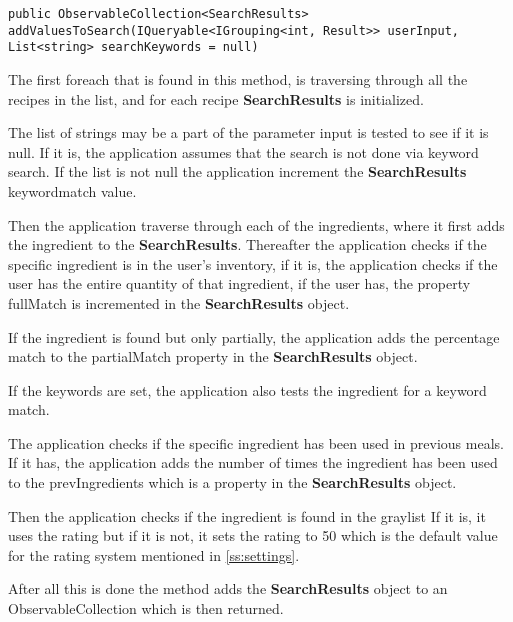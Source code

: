 \begin{lstlisting}[caption=addValuesToSearch, label={lst:addValuesToSearch}, language=CSharp]
        public ObservableCollection<SearchResults> addValuesToSearch(IQueryable<IGrouping<int, Result>> userInput, List<string> searchKeywords = null)
\end{lstlisting}

The first foreach that is found in this method, is traversing through all the recipes in the list, and for each recipe \textbf{SearchResults} is initialized.

The list of strings may be a part of the parameter input is tested to see if it is null. If it is, the application assumes that the search is not done via keyword search. If the list is not null the application increment the \textbf{SearchResults} keywordmatch value.

Then the application traverse through each of the ingredients, where it first adds the ingredient to the \textbf{SearchResults}. Thereafter the application checks if the specific ingredient is in the user's inventory, if it is, the application checks if the user has the entire quantity of that ingredient, if the user has, the property fullMatch is incremented in the \textbf{SearchResults} object.

If the ingredient is found but only partially, the application adds the percentage match to the partialMatch property in the \textbf{SearchResults} object.

If the keywords are set, the application also tests the ingredient for a keyword match.

The application checks if the specific ingredient has been used in previous meals.
If it has, the application adds the number of times the ingredient has been used to the prevIngredients which is a property in the \textbf{SearchResults} object.

Then the application checks if the ingredient is found in the graylist If it is, it uses the rating but if it is not, it sets the rating to 50 which is the default value for the rating system mentioned in \cref{ss:settings}.

After all this is done the method adds the \textbf{SearchResults} object to an ObservableCollection which is then returned.